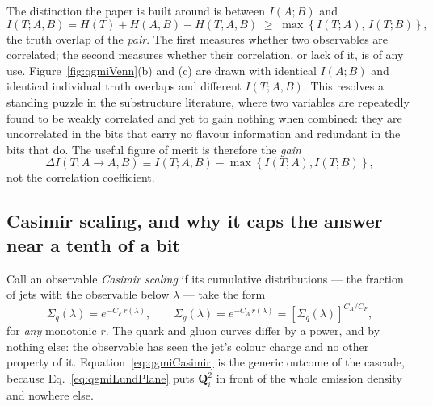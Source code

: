 The distinction the paper is built around is between \(I(A;B)\) and
\begin{equation}
	I(T;A,B) = H(T) + H(A,B) - H(T,A,B)
	\;\geq\; \max\left\{I(T;A),\,I(T;B)\right\} ,
	\label{eq:qgmiJoint}
\end{equation}
the truth overlap of the \emph{pair}. The first measures whether two observables are
correlated; the second measures whether their correlation, or lack of it, is of any
use. Figure~\ref{fig:qgmiVenn}(b) and (c) are drawn with identical \(I(A;B)\) and
identical individual truth overlaps and different \(I(T;A,B)\). This resolves a
standing puzzle in the substructure literature, where two variables are repeatedly
found to be weakly correlated and yet to gain nothing when combined: they are
uncorrelated in the bits that carry no flavour information and redundant in the bits
that do. The useful figure of merit is therefore the \emph{gain}
\begin{equation}
	\Delta I(T;A\to A,B) \equiv I(T;A,B) - \max\left\{I(T;A),I(T;B)\right\} ,
	\label{eq:qgmiGain}
\end{equation}
not the correlation coefficient.

\subsection{Casimir scaling, and why it caps the answer near a tenth of a bit}
\label{subsec:qgmiCasimir}

Call an observable \emph{Casimir scaling} if its cumulative distributions --- the
fraction of jets with the observable below \(\lambda\) --- take the form
\begin{equation}
	\Sigma_q(\lambda) = e^{-C_F\,r(\lambda)} ,
	\qquad
	\Sigma_g(\lambda) = e^{-C_A\,r(\lambda)}
	= \left[\Sigma_q(\lambda)\right]^{C_A/C_F} ,
	\label{eq:qgmiCasimir}
\end{equation}
for \emph{any} monotonic \(r\). The quark and gluon curves differ by a power, and by
nothing else: the observable has seen the jet's colour charge and no other property
of it. Equation~\ref{eq:qgmiCasimir} is the generic outcome of the cascade, because
Eq.~\ref{eq:qgmiLundPlane} puts \(\mathbf{Q}_i^2\) in front of the whole emission
density and nowhere else.

